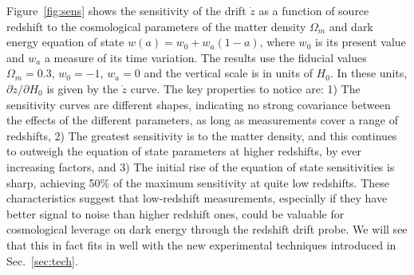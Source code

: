 \documentclass[preprint2, 10pt]{aastex}
\newcommand{\om}{\Omega_m}
\begin{document}
Figure~\ref{fig:sens} shows the sensitivity of the drift $\dot z$ as a 
function of source redshift to the cosmological parameters of the matter 
density $\om$ and dark energy equation of state $w(a)=w_0+w_a(1-a)$, where 
$w_0$ is its present value and $w_a$ a measure of its time variation.
The results use the fiducial values $\om=0.3$, $w_0=-1$, $w_a=0$ and the 
vertical scale is in units of $H_0$.  In these units, 
$\partial\dot z/\partial H_0$ is 
given by the $\dot z$ curve. The key properties to notice are: 
1) The sensitivity curves are different 
shapes, indicating no strong covariance between the effects of the different 
parameters, as long as measurements cover a range of redshifts, 
2) The greatest sensitivity is to the matter density, and this 
continues to outweigh the equation of state parameters at higher redshifts, 
by ever increasing factors, and 3) The initial rise of the equation of 
state sensitivities is sharp, achieving 50\% of the maximum sensitivity 
at quite low redshifts. These characteristics suggest that low-redshift 
measurements, especially if they have better signal to noise than higher 
redshift ones, could be valuable for cosmological leverage on dark energy 
through the redshift drift probe. We will see that this in fact fits in 
well with the new experimental techniques introduced in Sec.~\ref{sec:tech}. 
\end{document}

